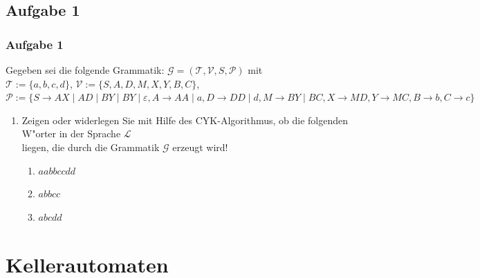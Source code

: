 \subsection{Aufgabe 1}
\begin{frame}
	\frametitle{Aufgabe 1} %
	Gegeben sei die folgende Grammatik: $\mathcal{G} = (\mathcal{T},\mathcal{V},S,
	\mathcal{P})$ mit\\
	$\mathcal{T} := \{a,b,c,d\}$, $\mathcal{V} := \{S,A,D,M,X,Y,B,C\}$, $\mathcal{P} := \{
	S \rightarrow AX \; | \; AD \; | \; BY \; | \; BY \; | \; \varepsilon, A \rightarrow AA \; | \; a, D \rightarrow DD \; | \; d, M \rightarrow BY \; | \; BC, X \rightarrow MD, Y \rightarrow MC, B \rightarrow b, C \rightarrow c \}$
	\begin{enumerate}
		\item Zeigen oder widerlegen Sie mit Hilfe des CYK-Algorithmus, ob die folgenden
		W"orter in der Sprache $\mathcal{L}$\\
		liegen, die durch die Grammatik $\mathcal{G}$ erzeugt wird!
		\begin{enumerate}
			\item $aabbccdd$
			\item $abbcc$
			\item $abcdd$
		\end{enumerate}
	\end{enumerate}
\end{frame}

\section{Kellerautomaten}
